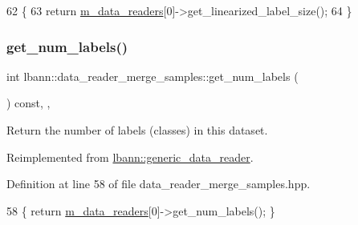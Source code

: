 \begin{DoxyCode}
62                                                  \{
63     \textcolor{keywordflow}{return} \hyperlink{classlbann_1_1generic__compound__data__reader_a9815e94ade5873415fd766e09d956d5b}{m\_data\_readers}[0]->get\_linearized\_label\_size();
64   \}
\end{DoxyCode}
\mbox{\label{classlbann_1_1data__reader__merge__samples_a98cb18c29a24358c9a385e29f57c3d57}} 
\subsubsection{\texorpdfstring{get\+\_\+num\+\_\+labels()}{get\_num\_labels()}}
{\footnotesize\ttfamily int lbann\+::data\+\_\+reader\+\_\+merge\+\_\+samples\+::get\+\_\+num\+\_\+labels (\begin{DoxyParamCaption}{ }\end{DoxyParamCaption}) const\hspace{0.3cm}{\ttfamily [inline]}, {\ttfamily [override]}, {\ttfamily [virtual]}}



Return the number of labels (classes) in this dataset. 



Reimplemented from \hyperlink{classlbann_1_1generic__data__reader_a935ce6262d75f1834e550c3bc16a6547}{lbann\+::generic\+\_\+data\+\_\+reader}.



Definition at line 58 of file data\+\_\+reader\+\_\+merge\+\_\+samples.\+hpp.


\begin{DoxyCode}
58 \{ \textcolor{keywordflow}{return} \hyperlink{classlbann_1_1generic__compound__data__reader_a9815e94ade5873415fd766e09d956d5b}{m\_data\_readers}[0]->get\_num\_labels(); \}
\end{DoxyCode}
\mbox{\label{classlbann_1_1data__reader__merge__samples_a43dc3d7861f0231d96a9baa77916dff5}} 
